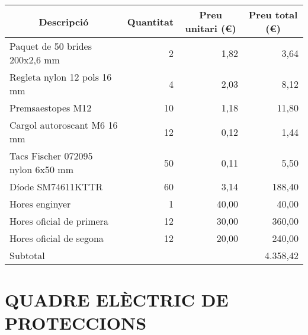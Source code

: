\begin{table}[H]
  \begin{center}
    \begin{tabularx} {\textwidth} {|X|r|r|r|} \hline
  \multicolumn{1}{|c|}{Descripció} &  \multicolumn{1}{c|}{Quantitat} & \multicolumn{1}{c|}{Preu unitari (€)} &  \multicolumn{1}{c|}{Preu total (€)}\\ \hline \hline

    Paquet de 50 brides 200x2,6  mm & 2     & 1,82  & 3,64 \\ \hline
    Regleta nylon 12 pols 16 mm & 4     & 2,03  & 8,12 \\ \hline
    Premsaestopes M12 & 10    & 1,18  & 11,80 \\ \hline
    Cargol autoroscant M6 16 mm & 12    & 0,12  & 1,44 \\ \hline
    Tacs Fischer 072095 nylon 6x50 mm & 50    & 0,11  & 5,50 \\ \hline
    Díode SM74611KTTR & 60    & 3,14  & 188,40 \\ \hline
    Hores enginyer & 1     & 40,00 & 40,00 \\ \hline
    Hores oficial de primera & 12    & 30,00 & 360,00 \\ \hline
    Hores oficial de segona & 12    & 20,00 & 240,00 \\ \hline  \hline
        \multicolumn{3}{|l}{Subtotal} & 4.358,42  \\ \hline
    \end{tabularx}%
  \end{center}
  \label{tab:addlabel}%
\end{table}%



\section{\uppercase{Quadre elèctric de proteccions}}

